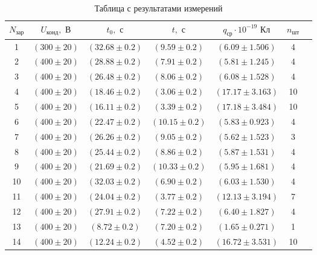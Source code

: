 \documentclass{lab}
\begin{document}
\begin{table}[H]
	\centering
	\begin{tabular}{|c|c|c|c|c|c|c|}
		\hline
		$N_\text{зар}$ & $U_\text{конд}, \text{ В}$ & $t_0, \text{ с} $ & $t, \text{ с} $   & $q_\text{ср} \cdot 10^{-19}\text{ Кл}$ & $n_\text{шт}$ \\
		\hline
		1              & $(300 \pm 20)$             & $(32.68 \pm 0.2)$ & $(9.59 \pm 0.2)$  & $(6.09   \pm 1.506)$                   & 4             \\
		2              & $(400 \pm 20)$             & $(28.88 \pm 0.2)$ & $(7.91 \pm 0.2)$  & $(5.81   \pm 1.245)$                   & 4             \\
		3              & $(400 \pm 20)$             & $(26.48 \pm 0.2)$ & $(8.06 \pm 0.2)$  & $(6.08   \pm 1.528)$                   & 4             \\
		4              & $(400 \pm 20)$             & $(18.46 \pm 0.2)$ & $(3.06 \pm 0.2)$  & $(17.17  \pm 3.163)$                   & 10            \\
		5              & $(400 \pm 20)$             & $(16.11 \pm 0.2)$ & $(3.39 \pm 0.2)$  & $(17.18  \pm 3.484)$                   & 10            \\
		6              & $(400 \pm 20)$             & $(22.47 \pm 0.2)$ & $(10.15 \pm 0.2)$ & $(5.83  \pm 0.923)$                    & 4             \\
		7              & $(400 \pm 20)$             & $(26.26 \pm 0.2)$ & $(9.05 \pm 0.2)$  & $(5.62   \pm 1.523)$                   & 3             \\
		8              & $(400 \pm 20)$             & $(25.44 \pm 0.2)$ & $(8.86 \pm 0.2)$  & $(5.87   \pm 1.531)$                   & 4             \\
		9              & $(400 \pm 20)$             & $(21.69 \pm 0.2)$ & $(10.33 \pm 0.2)$ & $(5.95  \pm 1.681)$                    & 4             \\
		10             & $( 400 \pm 20)$            & $(32.03 \pm 0.2)$ & $(6.90 \pm 0.2)$  & $(6.03  \pm 1.530)$                    & 4             \\
		11             & $(4 00 \pm 20)$            & $(24.04 \pm 0.2)$ & $(3.77 \pm 0.2)$  & $(12.13 \pm 3.194)$                    & 7             \\
		12             & $(40 0 \pm 20)$            & $(27.91 \pm 0.2)$ & $(7.22 \pm 0.2)$  & $(6.40  \pm 1.827)$                    & 4             \\
		13             & $(400  \pm 20)$            & $(8.72 \pm 0.2)$  & $(7.20 \pm 0.2)$  & $(1.65   \pm 0.271)$                   & 1             \\
		14             & $(400 \pm 20)$             & $(12.24 \pm 0.2)$ & $(4.52 \pm 0.2)$  & $(16.72 \pm 3.531)$                    & 10            \\
		\hline
	\end{tabular}
	\caption{Таблица с результатами измерений}
\end{table}
\end{document}
